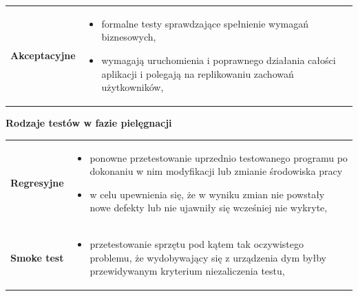 \documentclass[a4paper]{article}
\begin{document}
\begin{table}[H]
\begin{center}
\begin{tabular}{ p{2cm} p{14cm} }
                \cmidrule(r){1-2}

                \textbf{Akceptacyjne}
                &
                \begin{itemize}
                    \item formalne testy sprawdzające spełnienie wymagań biznesowych,
                    \item wymagają uruchomienia i
                    poprawnego działania całości aplikacji i polegają na replikowaniu zachowań użytkowników,
                \end{itemize}
                \\
            \end{tabular}
        \end{center}
    \end{table}


    \textbf{Rodzaje testów w fazie pielęgnacji}

    \begin{table}[H]
        \begin{center}
            \begin{tabular}{ p{2cm} p{14cm} }
                \textbf{Regresyjne}
                &
                \begin{itemize}
                    \item ponowne przetestowanie uprzednio testowanego programu po dokonaniu w nim modyfikacji lub zmianie
                    środowiska pracy
                    \item w celu upewnienia
                    się, że w wyniku zmian nie powstały nowe defekty lub nie ujawniły się wcześniej nie wykryte,
                \end{itemize}
                \\

                \cmidrule(r){1-2}

                \textbf{Smoke test}
                &
                \begin{itemize}
                    \item przetestowanie sprzętu pod kątem tak oczywistego problemu, że wydobywający się z urządzenia dym
                    byłby przewidywanym kryterium niezaliczenia testu,
                \end{itemize}
                \\
            \end{tabular}
        \end{center}
    \end{table}
\end{document}
